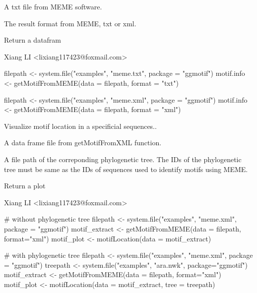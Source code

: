 \documentclass[a4paper]{book}
\begin{document}
%
\begin{Arguments}
\begin{ldescription}
\item[\code{data}] A txt file from MEME software.

\item[\code{format}] The result format from MEME, txt or xml.
\end{ldescription}
\end{Arguments}
%
\begin{Value}
Return a datafram
\end{Value}
%
\begin{Author}\relax
Xiang LI <lixiang117423@foxmail.com>
\end{Author}
%
\begin{Examples}
\begin{ExampleCode}
filepath <- system.file("examples", "meme.txt", package = "ggmotif")
motif.info <- getMotifFromMEME(data = filepath, format = "txt")

filepath <- system.file("examples", "meme.xml", package = "ggmotif")
motif.info <- getMotifFromMEME(data = filepath, format = "xml")
\end{ExampleCode}
\end{Examples}
%
\begin{Description}\relax
{} Visualize motif location in a specificial sequences..
\end{Description}
%
\begin{Arguments}
\begin{ldescription}
\item[\code{data}] A data frame file from getMotifFromXML function.

\item[\code{tree.path}] A file path of the correponding phylogenetic tree.
The IDs of the phylogenetic tree must be same as the IDs of sequences used to identify motifs using MEME.
\end{ldescription}
\end{Arguments}
%
\begin{Value}
Return a plot
\end{Value}
%
\begin{Author}\relax
Xiang LI <lixiang117423@foxmail.com>
\end{Author}
%
\begin{Examples}
\begin{ExampleCode}
# without phylogenetic tree
filepath <- system.file("examples", "meme.xml", package = "ggmotif")
motif_extract <- getMotifFromMEME(data = filepath, format="xml")
motif_plot <- motifLocation(data = motif_extract)

# with phylogenetic tree
filepath <- system.file("examples", "meme.xml", package = "ggmotif")
treepath <- system.file("examples", "ara.nwk", package="ggmotif")
motif_extract <- getMotifFromMEME(data = filepath, format="xml")
motif_plot <- motifLocation(data = motif_extract, tree = treepath)

\end{ExampleCode}
\end{Examples}
\printindex{}
\end{document}

